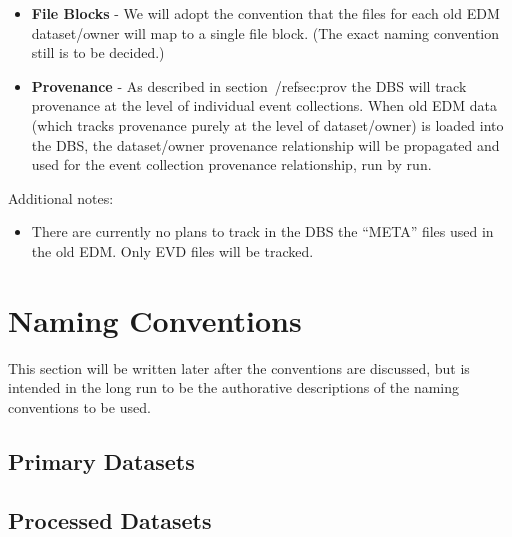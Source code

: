 \documentclass[pdftex]{cmspaper}
\begin{document}
{\begin{itemize}
\begin{center}
   /$<$Dataset$>$/$<$DataTier$>$/$<$Owner$>$/EvC\_Run$<$run-number$>$ 
\end{center}

and these will be the event collection names entered into the DBS. Jobs
will be configured with one or more such event collections. (Note that
this doesn't imply that the same naming convention for event collections
will be used for event collections in the new Framework/EDM. This is just
what works currently with ORCA and the old EDM.)

\item {\bf File Blocks} - We will adopt the convention that the files for each 
                    old 
                    EDM dataset/owner will map to a single file block. (The
                    exact naming convention still is to be decided.)
\item {\bf Provenance} - As described in section~/ref{sec:prov} the DBS
                    will track provenance at the level of individual event
                    collections. When old EDM data (which tracks provenance
                    purely at the level of dataset/owner) is loaded into
                    the DBS, the dataset/owner provenance relationship will
                    be propagated and used for the event collection provenance
                    relationship, run by run.
\end{itemize}

  Additional notes:

\begin{itemize}
\item There are currently no plans to track in the DBS the ``META'' files 
used in the old EDM. Only EVD files will be tracked. 
\end{itemize}

\section{Naming Conventions}

  This section will be written later after the conventions are discussed, but 
is intended in the long run to be the authorative descriptions of the naming
conventions to be used.
\subsection{Primary Datasets}
\subsection{Processed Datasets}
}
\end{document}

